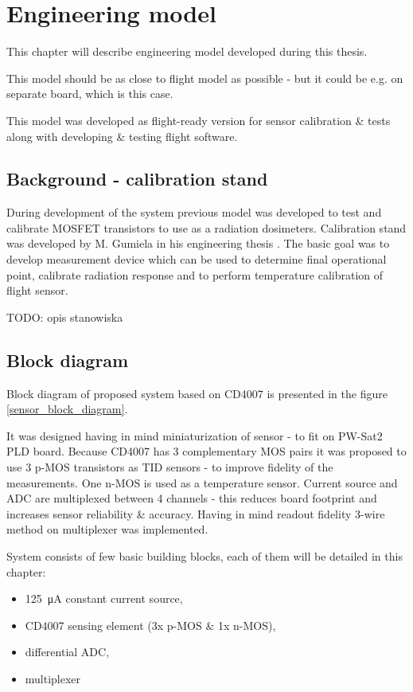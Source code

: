 \chapter{Engineering model}
\label{Engineering_model_chapter}
This chapter will describe engineering model developed during this thesis.

This model should be as close to flight model as possible - but it could be e.g. on separate board, which is this case.

This model was developed as flight-ready version for sensor calibration \& tests along with developing \& testing flight software.

\section{Background - calibration stand}
    During development of the system previous model was developed to test and calibrate MOSFET transistors to use as a radiation dosimeters. Calibration stand was developed by M. Gumiela in his engineering thesis \cite{MGThesis}. The basic goal was to develop measurement device which can be used to determine final operational point, calibrate radiation response and to perform temperature calibration of flight sensor.

    TODO: opis stanowiska


\section{Block diagram}
    Block diagram of proposed system based on CD4007 is presented in the figure \ref{sensor_block_diagram}.

    It was designed having in mind miniaturization of sensor - to fit on PW-Sat2 PLD board. Because CD4007 has 3 complementary MOS pairs it was proposed to use 3 p-MOS transistors as TID sensors - to improve fidelity of the measurements. One n-MOS is used as a temperature sensor. Current source and ADC are multiplexed between 4 channels - this reduces board footprint and increases sensor reliability \& accuracy. Having in mind readout fidelity 3-wire method on multiplexer was implemented.

    System consists of few basic building blocks, each of them will be detailed in this chapter:
    \begin{itemize}
        \item \SI{125}{\uA} constant current source,
        \item CD4007 sensing element (3x p-MOS \& 1x n-MOS),
        \item differential ADC,
        \item multiplexer
    \end{itemize}


